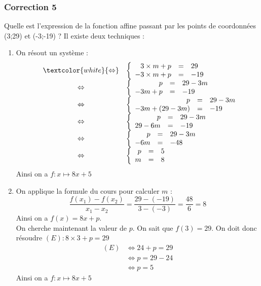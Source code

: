 \documentclass[15pt, mathserif]{beamer}
\begin{document}
\begin{frame}
\vspace{-10mm}
	\frametitle{Correction 5}
\vspace*{1cm} 
 \footnotesize{Quelle est l'expression de la fonction affine passant par les points de coordonnées (3;29) et (-3;-19) ? Il existe deux techniques :} 
 \begin{multicols}{2} 
 \begin{enumerate} 
 \item On résout un système : $$ \begin{array}{rcl} 
 & \textcolor{white}{\Leftrightarrow} & 
 \left 
 \{\begin{array}{rcl}3\times m + p&=&29 \\ 
 -3\times m+p&=&-19\end{array} \right. \\ 
 &\Leftrightarrow & \left 
 \{\begin{array}{rcl} p&=&29-3m \\ 
 -3m+p&=&-19\end{array} \right. \\ 
 &\Leftrightarrow & \left 
 \{\begin{array}{rcl} p&=&29-3m \\ 
 -3m+(29-3m) &=&-19\end{array} \right. \\ &\Leftrightarrow& \left \{\begin{array}{rcl}p&=&29-3m \\ 
 29-6m&=&-19\end{array} \right. \\ &\Leftrightarrow& \left \{\begin{array}{rcl}p&=&29-3m \\ 
 -6m&=&-48\end{array} \right. \\  &\Leftrightarrow& \left \{\begin{array}{rcl} p&=&5 \\  m&=&8\end{array}\right. \end{array}$$ 
 Ainsi on a $f:x\mapsto 8x+5$ 
 \columnbreak 
 \item 
 \footnotesize{On applique la formule du cours pour calculer $m$ :$$ \dfrac{f(x_1)-f(x_2)}{x_1-x_2}=\dfrac{29-\left(-19\right)}{3-\left(-3\right)}= \dfrac{48}{6}=8$$} \footnotesize{ Ainsi on a $f(x)= 8x +p $. 
  \\ On cherche maintenant la valeur de $p$. On sait que $f(3)=29$. On doit donc résoudre $(E): 8\times3+p=29$}	 
 \begin{align*} (E)& \Leftrightarrow 24+p=29\\
		 	 & \Leftrightarrow p=29-24\\
			 & \Leftrightarrow p=5
	 \end{align*} 
 Ainsi on a $f:x\mapsto 8x+5$ 
 \end{enumerate} 
 \end{multicols} 
 \end{frame}
\end{document}

